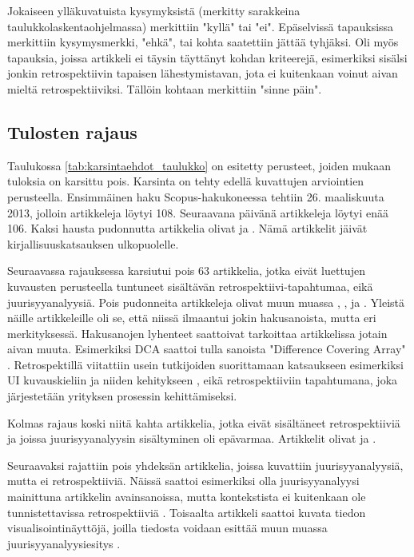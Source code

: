 Jokaiseen ylläkuvatuista kysymyksistä (merkitty sarakkeina taulukkolaskentaohjelmassa) merkittiin "kyllä" tai "ei". Epäselvissä tapauksissa merkittiin kysymysmerkki, "ehkä", tai kohta saatettiin jättää tyhjäksi. Oli myös tapauksia, joissa artikkeli ei täysin täyttänyt kohdan kriteerejä, esimerkiksi sisälsi jonkin retrospektiivin tapaisen lähestymistavan, jota ei kuitenkaan voinut aivan mieltä retrospektiiviksi. Tällöin kohtaan merkittiin "sinne päin".

\subsection{Tulosten rajaus}
Taulukossa \ref{tab:karsintaehdot_taulukko} on esitetty perusteet, joiden mukaan tuloksia on karsittu pois. Karsinta on tehty edellä kuvattujen arviointien perusteella. Ensimmäinen haku Scopus-hakukoneessa tehtiin 26. maaliskuuta 2013, jolloin artikkeleja löytyi 108. Seuraavana päivänä artikkeleja löytyi enää 106. Kaksi hausta pudonnutta artikkelia olivat \citep{bolosky2007farsite} ja \citep{dreiseitl2005nomographic}. Nämä artikkelit jäivät kirjallisuuskatsauksen ulkopuolelle.

Seuraavassa rajauksessa karsiutui pois 63 artikkelia, jotka eivät luettujen kuvausten perusteella tuntuneet sisältävän retrospektiivi-tapahtumaa, eikä juurisyyanalyysiä. Pois pudonneita artikkeleja olivat muun muassa \citep{yang2012personalized}, \citep{ji2010constructions}, \citep{helms2008retrospective} ja \citep{richardson2006developing}. Yleistä näille artikkeleille oli se, että niissä ilmaantui jokin hakusanoista, mutta eri merkityksessä. Hakusanojen lyhenteet saattoivat tarkoittaa artikkelissa jotain aivan muuta. Esimerkiksi DCA saattoi tulla sanoista "Difference Covering Array" \citep{ji2010constructions}. Retrospektillä viitattiin usein tutkijoiden suorittamaan katsaukseen esimerkiksi UI kuvauskieliin ja niiden kehitykseen \citep{helms2008retrospective}, eikä retrospektiiviin tapahtumana, joka järjestetään yrityksen prosessin kehittämiseksi.

Kolmas rajaus koski niitä kahta artikkelia, jotka eivät sisältäneet retrospektiiviä ja joissa juurisyyanalyysin sisältyminen oli epävarmaa. Artikkelit olivat \citep{anquetil2007software} ja \citep{wang2004strider}.

Seuraavaksi rajattiin pois yhdeksän artikkelia, joissa kuvattiin juurisyyanalyysiä, mutta ei retrospektiiviä. Näissä saattoi esimerkiksi olla juurisyyanalyysi mainittuna artikkelin avainsanoissa, mutta kontekstista ei kuitenkaan ole tunnistettavissa retrospektiiviä \citep{yu1998software}. Toisaalta artikkeli saattoi kuvata tiedon visualisointinäyttöjä, joilla tiedosta voidaan esittää muun muassa juurisyyanalyysiesitys \citep{hao2008density}.

